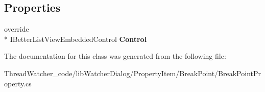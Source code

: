 \subsection*{Properties}
\begin{DoxyCompactItemize}
\item 
\hypertarget{classlib_watcher_dialog_1_1_property_item_1_1_break_point_1_1_break_point_property_a93434897b7a98fb3474ef023b02796a4}{override \\*
I\+Better\+List\+View\+Embedded\+Control {\bfseries Control}}\label{classlib_watcher_dialog_1_1_property_item_1_1_break_point_1_1_break_point_property_a93434897b7a98fb3474ef023b02796a4}

\end{DoxyCompactItemize}


The documentation for this class was generated from the following file\+:\begin{DoxyCompactItemize}
\item 
Thread\+Watcher\+\_\+code/lib\+Watcher\+Dialog/\+Property\+Item/\+Break\+Point/Break\+Point\+Property.\+cs\end{DoxyCompactItemize}
